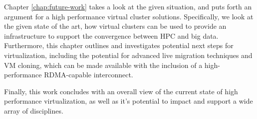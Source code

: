 Chapter \ref{chap:future-work} takes a look at the given situation, and puts forth an argument for a high performance virtual cluster solutions. Specifically, we look at the given state of the art, how virtual clusters can be used to provide an infrastructure to support the convergence between HPC and big data. Furthermore, this chapter outlines and investigates potential next steps for virtualization, including the potential for advanced live migration techniques and VM cloning, which can be made available with the inclusion of a high-performance RDMA-capable interconnect. 

Finally, this work concludes with an overall view of the current state of high performance virtualization, as well as it's potential to impact and support a wide array of disciplines. 



